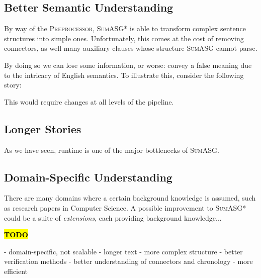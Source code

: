 \subsection{Better Semantic Understanding}

By way of the \textsc{Preprocessor}, \textsc{SumASG*} is able to transform complex sentence structures into simple ones. Unfortunately, this comes at the cost of removing connectors, as well many auxiliary clauses whose structure \textsc{SumASG} cannot parse.

By doing so we can lose some information, or worse: convey a false meaning due to the intricacy of English semantics. To illustrate this, consider the following story:

\begin{displayquote}

\end{displayquote}

This would require changes at all levels of the pipeline.

\subsection{Longer Stories}

As we have seen, runtime is one of the major bottlenecks of \textsc{SumASG}.

\subsection{Domain-Specific Understanding}

There are many domains where a certain background knowledge is assumed, such as research papers in Computer Science. A possible improvement to \textsc{SumASG*} could be a suite of \textit{extensions}, each providing background knowledge...

\textcolor{red}{\textbf{\hl{TODO}}}

- domain-specific, not scalable
- longer text
- more complex structure
- better verification methods
- better understanding of connectors and chronology
- more efficient